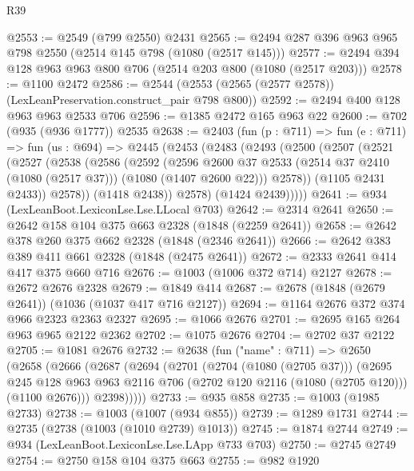 \begin{lexlean}{R39}
\begin{coremodule}
@2553 := @2549 (@799 @2550) @2431
@2565 := @2494 @287 @396 @963 @965 @798 @2550 (@2514 @145 @798 (@1080 (@2517 @145)))
@2577 := @2494 @394 @128 @963 @963 @800 @706 (@2514 @203 @800 (@1080 (@2517 @203)))
@2578 := @1100 @2472
@2586 := @2544 (@2553 (@2565 (@2577 @2578)) (LexLeanPreservation.construct_pair @798 @800))
@2592 := @2494 @400 @128 @963 @963 @2533 @706
@2596 := @1385 @2472 @165 @963 @22
@2600 := @702 (@935 (@936 @1777)) @2535
@2638 := @2403
    (fun (p : @711) =>
    fun (e : @711) =>
    fun (us : @694) =>
    @2445
      (@2453
        (@2483
          (@2493
            (@2500
              (@2507
                (@2521
                  (@2527
                    (@2538
                      (@2586
                        (@2592
                          (@2596
                            @2600
                            @37
                            @2533
                            (@2514 @37 @2410 (@1080 (@2517 @37)))
                            (@1080 (@1407 @2600 @22)))
                          @2578))
                      (@1105 @2431 @2433))
                    @2578))
                (@1418 @2438))
              @2578)
            (@1424 @2439)))))
@2641 := @934 (LexLeanBoot.LexiconLse.Lse.LLocal @703)
@2642 := @2314 @2641
@2650 := @2642 @158 @104 @375 @663 @2328 (@1848 (@2259 @2641))
@2658 := @2642 @378 @260 @375 @662 @2328 (@1848 (@2346 @2641))
@2666 := @2642 @383 @389 @411 @661 @2328 (@1848 (@2475 @2641))
@2672 := @2333 @2641 @414 @417 @375 @660 @716
@2676 := @1003 (@1006 @372 @714) @2127
@2678 := @2672 @2676 @2328
@2679 := @1849 @414
@2687 := @2678 (@1848 (@2679 @2641)) (@1036 (@1037 @417 @716 @2127))
@2694 := @1164 @2676 @372 @374 @966 @2323 @2363 @2327
@2695 := @1066 @2676
@2701 := @2695 @165 @264 @963 @965 @2122 @2362
@2702 := @1075 @2676
@2704 := @2702 @37 @2122
@2705 := @1081 @2676
@2732 := @2638
    (fun ("name" : @711) =>
    @2650
      (@2658
        (@2666
          (@2687
            (@2694
              (@2701
                (@2704 (@1080 (@2705 @37)))
                (@2695
                  @245
                  @128
                  @963
                  @963
                  @2116
                  @706
                  (@2702 @120 @2116 (@1080 (@2705 @120)))
                  (@1100 @2676)))
              @2398)))))
@2733 := @935 @858
@2735 := @1003 (@1985 @2733)
@2738 := @1003 (@1007 (@934 @855))
@2739 := @1289 @1731
@2744 := @2735 (@2738 (@1003 (@1010 @2739) @1013))
@2745 := @1874 @2744
@2749 := @934 (LexLeanBoot.LexiconLse.Lse.LApp @733 @703)
@2750 := @2745 @2749
@2754 := @2750 @158 @104 @375 @663
@2755 := @982 @1920

\end{coremodule}
\end{lexlean}
